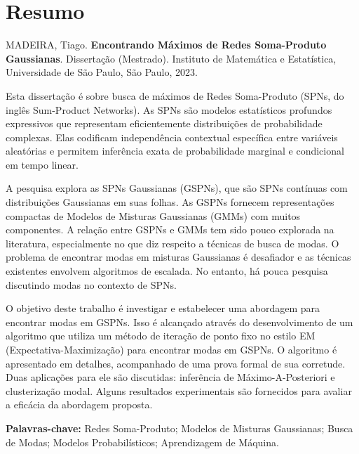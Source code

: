 \chapter*{Resumo}

MADEIRA, Tiago. \textbf{Encontrando Máximos de Redes Soma-Produto Gaussianas}. Dissertação (Mestrado). Instituto de Matemática e Estatística, Universidade de São Paulo, São Paulo, 2023.

\vspace{1em}

Esta dissertação é sobre busca de máximos de Redes Soma-Produto (SPNs, do inglês Sum-Product Networks). As SPNs são modelos estatísticos profundos expressivos que representam eficientemente distribuições de probabilidade complexas. Elas codificam independência contextual específica entre variáveis aleatórias e permitem inferência exata de probabilidade marginal e condicional em tempo linear.

A pesquisa explora as SPNs Gaussianas (GSPNs), que são SPNs contínuas com distribuições Gaussianas em suas folhas. As GSPNs fornecem representações compactas de Modelos de Misturas Gaussianas (GMMs) com muitos componentes. A relação entre GSPNs e GMMs tem sido pouco explorada na literatura, especialmente no que diz respeito a técnicas de busca de modas. O problema de encontrar modas em misturas Gaussianas é desafiador e as técnicas existentes envolvem algoritmos de escalada. No entanto, há pouca pesquisa discutindo modas no contexto de SPNs.

O objetivo deste trabalho é investigar e estabelecer uma abordagem para encontrar modas em GSPNs. Isso é alcançado através do desenvolvimento de um algoritmo que utiliza um método de iteração de ponto fixo no estilo EM (Expectativa-Maximização) para encontrar modas em GSPNs. O algoritmo é apresentado em detalhes, acompanhado de uma prova formal de sua corretude. Duas aplicações para ele são discutidas: inferência de Máximo-A-Posteriori e clusterização modal. Alguns resultados experimentais são fornecidos para avaliar a eficácia da abordagem proposta.

\vspace{1em}

\noindent \textbf{Palavras-chave:} Redes Soma-Produto; Modelos de Misturas Gaussianas; Busca de Modas; Modelos Probabilísticos; Aprendizagem de Máquina.
